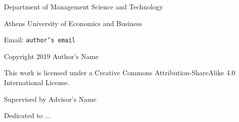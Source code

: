 




\begin{titlepage}

\end{titlepage}

\clearpage
\vspace*{\fill}
\begin{minipage}{.9\textwidth}
\centerline{Department of Management Science and Technology}
\centerline{Athens University of Economics and Business}
\centerline{Email: {\tt author's email}}
\vspace{1cm}
\centerline{Copyright 2019 Author's Name}
\centerline{This work is licensed under a Creative Commons Attribution-ShareAlike 4.0 International License.}
\end{minipage}
\vfill %
\clearpage

\clearpage
\vspace*{\fill}
\begin{minipage}{.9\textwidth}
\centerline{Supervised by Advisor's Name}
\end{minipage}
\vfill %
\clearpage

\clearpage
\vspace*{\fill}
\begin{minipage}{.9\textwidth}
\begin{flushright}
Dedicated to ...
\end{flushright}
\end{minipage}
\vfill %
\clearpage

\tableofcontents
\clearpage

\listoffigures
\clearpage

\listoftables
\clearpage




\clearpage

\pagestyle{fancy}
\fancyhf{}
\fancyhead[L]{\thepage\ / \pageref{LastPage}}
\fancyhead[R]{\it \rightmark}











